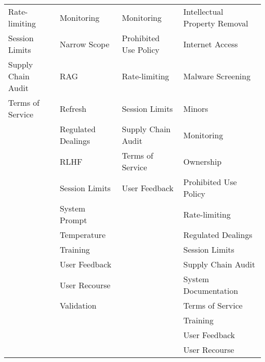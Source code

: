 \documentclass[fleqn]{article}
\begin{document}
\begin{table}[H]
\begin{tabular}{llll}
	Rate-limiting  & Monitoring & Monitoring & Intellectual Property Removal \\
	Session Limits & Narrow Scope & Prohibited Use Policy & Internet Access \\
	Supply Chain Audit & RAG & Rate-limiting  & Malware Screening \\
	Terms of Service & Refresh & Session Limits & Minors \\
	& Regulated Dealings & Supply Chain Audit & Monitoring \\
	& RLHF & Terms of Service & Ownership \\
	& Session Limits & User Feedback & Prohibited Use Policy \\
	& System Prompt  &  & Rate-limiting  \\
	& Temperature &  & Regulated Dealings \\
	& Training  &  & Session Limits \\
	& User Feedback &  & Supply Chain Audit \\
	& User Recourse &  & System Documentation \\
	& Validation &  & Terms of Service \\
	&  &  & Training  \\
	&  &  & User Feedback \\
	&  &  & User Recourse \\
	\end{tabular}
\end{table}

\pagebreak
\end{document}
